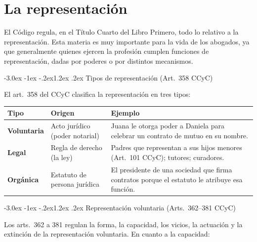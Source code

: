 \documentclass[12pt,oneside]{book}
\makeatletter
\renewcommand\section{\@startsection{section}{1}{\z@}%
  {-3.0ex \@plus -1ex \@minus -.2ex}{1.2ex \@plus .2ex}%
  {\normalfont\large\bfseries\color{acento}}}
\makeatother
\begin{document}

\chapter{La representación}
El Código regula, en el Título Cuarto del Libro Primero, todo lo relativo a la representación. Esta materia es muy importante para la vida de los abogados, ya que generalmente quienes ejercen la profesión cumplen funciones de representación, dadas por poderes o por distintos mecanismos.

\section{Tipos de representación (Art.~358 CCyC)}

El art.~358 del CCyC clasifica la representación en tres tipos:

\begin{center}
\renewcommand{\arraystretch}{1.3}
\begin{tabularx}{\textwidth}{
    >{\raggedright\arraybackslash\bfseries}p{2.4cm}
    >{\raggedright\arraybackslash}p{4.4cm}
    >{\raggedright\arraybackslash}X
}
\toprule
\textbf{Tipo} & \textbf{Origen} & \textbf{Ejemplo} \\
\midrule
Voluntaria & Acto jurídico (poder notarial) & Juana le otorga poder a Daniela para celebrar un contrato de mutuo en su nombre. \\
\addlinespace
Legal & Regla de derecho (la ley) & Padres que representan a sus hijos menores (Art.~101 CCyC); tutores; curadores. \\
\addlinespace
Orgánica & Estatuto de persona jurídica & El presidente de una sociedad que firma contratos porque el estatuto le atribuye esa función. \\
\bottomrule
\end{tabularx}
\end{center}

\section{Representación voluntaria (Arts.~362--381 CCyC)}

Los arts.~362 a 381 regulan la forma, la capacidad, los vicios, la actuación y la extinción de la representación voluntaria. En cuanto a la capacidad:
\end{document}
